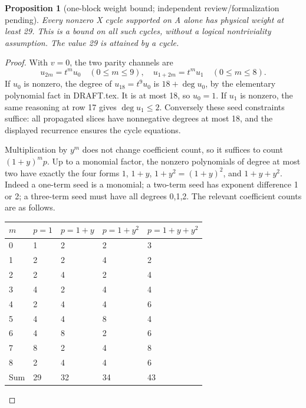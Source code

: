 \documentclass{article}
\newtheorem{proposition}{Proposition}
\begin{document}
\begin{proposition}[one-block weight bound; independent review\slash formalization pending]%
  \label{prop:one-block}
  Every nonzero X cycle supported on A alone has physical weight at least 29. This is a
  bound on all such cycles, without a logical nontriviality assumption. The value 29 is
  attained by a cycle.
\end{proposition}

\begin{proof}
  With \(v = 0\), the two parity channels are
  \begin{equation}
    u_{2m} = t^m u_0 \quad (0 \le m \le 9), \quad
    u_{1+2m} = t^m u_1 \quad (0 \le m \le 8).
  \end{equation}
  If \(u_0\) is nonzero, the degree of \(u_{18} = t^9 u_0\) is \(18 + \deg u_0\), by the
  elementary polynomial fact in DRAFT.tex. It is at most 18, so \(u_0 = 1\). If \(u_1\)
  is nonzero, the same reasoning at row 17 gives \(\deg u_1 \le 2\). Conversely these seed
  constraints suffice: all propagated slices have nonnegative degrees at most 18, and the
  displayed recurrence ensures the cycle equations.

  Multiplication by \(y^m\) does not change coefficient count, so it suffices to count
  \((1 + y)^m p\). Up to a monomial factor, the nonzero polynomials of degree at most two
  have exactly the four forms \(1\), \(1 + y\), \(1 + y^2 = (1 + y)^2\), and
  \(1 + y + y^2\). Indeed a one-term seed is a monomial; a two-term seed has exponent
  difference 1 or 2; a three-term seed must have all degrees 0,1,2. The relevant
  coefficient counts are as follows.

  \begin{center}
    \begin{tabular}{lllll}
      \(m\) & \(p = 1\) & \(p = 1 + y\) & \(p = 1 + y^2\) & \(p = 1 + y + y^2\) \\
      \hline
      0 & 1 & 2 & 2 & 3 \\
      1 & 2 & 2 & 4 & 2 \\
      2 & 2 & 4 & 2 & 4 \\
      3 & 4 & 2 & 4 & 4 \\
      4 & 2 & 4 & 4 & 6 \\
      5 & 4 & 4 & 8 & 4 \\
      6 & 4 & 8 & 2 & 6 \\
      7 & 8 & 2 & 4 & 8 \\
      8 & 2 & 4 & 4 & 6 \\
      Sum & 29 & 32 & 34 & 43 \\
    \end{tabular}
  \end{center}


\end{proof}
\end{document}
